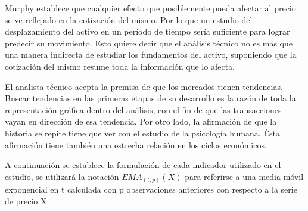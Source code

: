 \documentclass[a4paper,12pt]{Latex/Classes/PhDthesisPSnPDF}
\begin{document}
Murphy establece que cualquier efecto que posiblemente pueda afectar al precio se ve reflejado en la cotización del mismo. Por lo que un estudio del desplazamiento del activo en un período de tiempo sería suficiente para lograr predecir su movimiento. Esto quiere decir que el análisis técnico no es más que una manera indirecta de estudiar los fundamentos del activo, suponiendo que la cotización del mismo resume toda la información que lo afecta. 

El analista técnico acepta la premisa de que los mercados tienen tendencias. Buscar tendencias en las primeras etapas de su desarrollo es la razón de toda la representación gráfica dentro del análisis, con el fin de que las transacciones vayan en dirección de esa tendencia. Por otro lado, la afirmación de que la historia se repite tiene que ver con el estudio de la psicología humana. Ésta afirmación tiene también una estrecha relación en los ciclos económicos. 

A continuación se establece la formulación de cada indicador utilizado en el estudio, se utilizará la notación $EMA_{(t, p)}(X)$ para referirse a una media móvil exponencial en t calculada con p observaciones anteriores con respecto a la serie de precio X:
\end{document}
